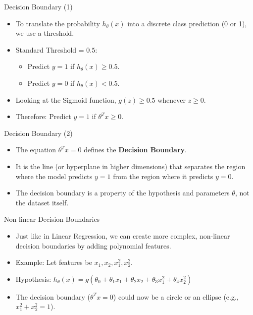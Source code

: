 \documentclass[aspectratio=169]{beamer}
\begin{document}
\begin{frame}{Decision Boundary (1)}
\begin{itemize}
    \item To translate the probability $h_\theta(x)$ into a discrete class prediction (0 or 1), we use a threshold.
    \item Standard Threshold = $0.5$:
    \begin{itemize}
        \item Predict $y=1$ if $h_\theta(x) \ge 0.5$.
        \item Predict $y=0$ if $h_\theta(x) < 0.5$.
    \end{itemize}
    \item Looking at the Sigmoid function, $g(z) \ge 0.5$ whenever $z \ge 0$.
    \item Therefore: Predict $y=1$ if $\theta^T x \ge 0$.
\end{itemize}
\end{frame}

\begin{frame}{Decision Boundary (2)}
\begin{itemize}
    \item The equation $\theta^T x = 0$ defines the \textbf{Decision Boundary}.
    \item It is the line (or hyperplane in higher dimensions) that separates the region where the model predicts $y=1$ from the region where it predicts $y=0$.
    \item The decision boundary is a property of the hypothesis and parameters $\theta$, not the dataset itself.
\end{itemize}
\end{frame}

\begin{frame}{Non-linear Decision Boundaries}
\begin{itemize}
    \item Just like in Linear Regression, we can create more complex, non-linear decision boundaries by adding polynomial features.
    \item Example: Let features be $x_1, x_2, x_1^2, x_2^2$.
    \item Hypothesis: $h_\theta(x) = g(\theta_0 + \theta_1 x_1 + \theta_2 x_2 + \theta_3 x_1^2 + \theta_4 x_2^2)$
    \item The decision boundary ($\theta^T x = 0$) could now be a circle or an ellipse (e.g., $x_1^2 + x_2^2 = 1$).
\end{itemize}
\end{frame}
\end{document}
